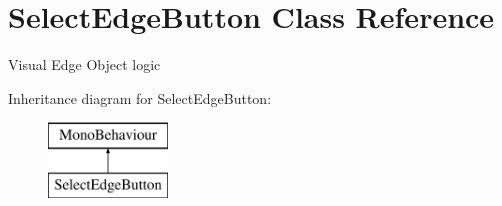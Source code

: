 \hypertarget{class_select_edge_button}{}\section{Select\+Edge\+Button Class Reference}
\label{class_select_edge_button}


Visual Edge Object logic  


Inheritance diagram for Select\+Edge\+Button\+:\begin{figure}[H]
\begin{center}
\leavevmode
\includegraphics[height=2.000000cm]{class_select_edge_button}
\end{center}
\end{figure}
